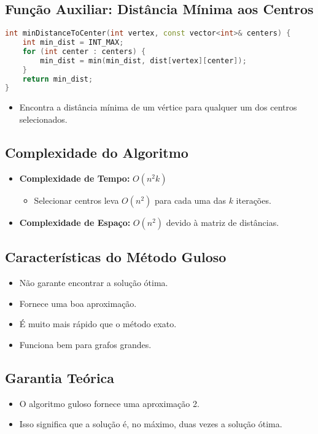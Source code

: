 \documentclass[10pt,conference]{IEEEtran}
\begin{document}
\subsection{Função Auxiliar: Distância Mínima aos Centros}
\begin{lstlisting}[language=C++]
int minDistanceToCenter(int vertex, const vector<int>& centers) {
    int min_dist = INT_MAX;
    for (int center : centers) {
        min_dist = min(min_dist, dist[vertex][center]);
    }
    return min_dist;
}
\end{lstlisting}
\begin{itemize}
    \item Encontra a distância mínima de um vértice para qualquer um dos centros selecionados.
\end{itemize}

\subsection*{Complexidade do Algoritmo}
\begin{itemize}
    \item \textbf{Complexidade de Tempo:} $O(n^2k)$
    \begin{itemize}
        \item Selecionar centros leva $O(n^2)$ para cada uma das $k$ iterações.
    \end{itemize}
    \item \textbf{Complexidade de Espaço:} $O(n^2)$ devido à matriz de distâncias.
\end{itemize}

\subsection{Características do Método Guloso}
\begin{itemize}
    \item Não garante encontrar a solução ótima.
    \item Fornece uma boa aproximação.
    \item É muito mais rápido que o método exato.
    \item Funciona bem para grafos grandes.
\end{itemize}

\subsection{Garantia Teórica}
\begin{itemize}
    \item O algoritmo guloso fornece uma aproximação 2.
    \item Isso significa que a solução é, no máximo, duas vezes a solução ótima.
\end{itemize}
\end{document}

